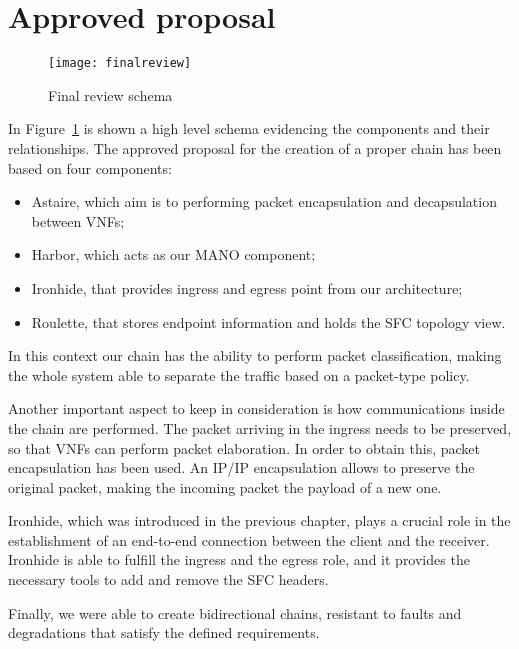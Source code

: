 \section{Approved proposal}

\begin{figure}[t]
  \centering
  \texttt{[image: finalreview]}
  \caption{Final review schema}
  \label{chap:impl:img:finalreview}
\end{figure}
In Figure~\ref{chap:impl:img:finalreview} is shown a high level schema
evidencing the components and their relationships. The approved proposal for the
creation of a proper chain has been based on four components:
\begin{itemize}
\item Astaire, which aim is to performing packet encapsulation and decapsulation
  between VNFs;
\item Harbor, which acts as our MANO component;
\item Ironhide, that provides ingress and egress point from our architecture;
\item Roulette, that stores endpoint information and holds the SFC topology
  view.
\end{itemize}

In this context our chain has the ability to perform packet classification,
making the whole system able to separate the traffic based on a packet-type
policy. 

Another important aspect to keep in consideration is how communications inside
the chain are performed. The packet arriving in the ingress needs to be
preserved, so that VNFs can perform packet elaboration. In order to obtain this,
packet encapsulation has been used. An IP/IP encapsulation allows to preserve
the original packet, making the incoming packet the payload of a new one.

Ironhide, which was introduced in the previous chapter, plays a crucial role in
the establishment of an end-to-end connection between the client and the
receiver. Ironhide is able to fulfill the ingress and the egress role, and it
provides the necessary tools to add and remove the SFC headers.

Finally, we were able to create bidirectional chains, resistant to faults and
degradations that satisfy the defined requirements.
